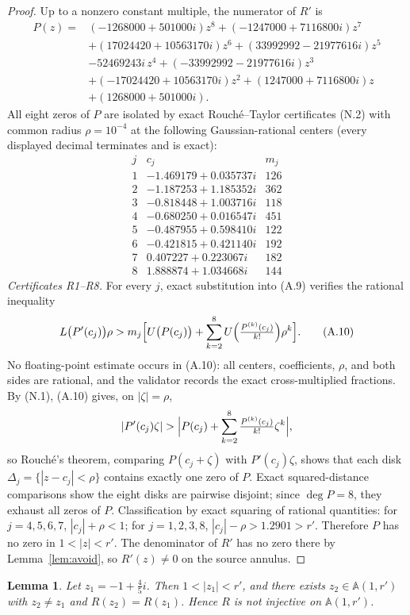 \documentclass[11pt,reqno]{amsart}
\newtheorem{lemma}[theorem]{Lemma}
\theoremstyle{definition}
\theoremstyle{remark}
\begin{document}
\begin{proof}
Up to a nonzero constant multiple, the numerator of \(R'\) is
\[\begin{aligned} P(z)={}&(-1268000+501000i)z^{8}+(-1247000+7116800i)z^{7}\\ &+(17024420+10563170i)z^{6}+(33992992-21977616i)z^{5}\\ &-52469243i\,z^{4}+(-33992992-21977616i)z^{3}\\ &+(-17024420+10563170i)z^{2}+(1247000+7116800i)z\\ &+(1268000+501000i). \end{aligned}\tag{A.9}\]
All eight zeros of \(P\) are isolated by exact Rouch\'e--Taylor certificates (N.2) with common radius \(\rho=10^{-4}\) at the following Gaussian-rational centers (every displayed decimal terminates and is exact):
\[\begin{array}{r|l|r}
j & c_j & m_j\\\hline
1 & -1.469179+0.035737i & 126\\
2 & -1.187253+1.185352i & 362\\
3 & -0.818448+1.003716i & 118\\
4 & -0.680250+0.016547i & 451\\
5 & -0.487955+0.598410i & 122\\
6 & -0.421815+0.421140i & 192\\
7 & 0.407227+0.223067i & 182\\
8 & 1.888874+1.034668i & 144
\end{array}\]
\emph{Certificates R1--R8.} For every \(j\), exact substitution into (A.9) verifies the rational inequality
\[ L\bigl(P'(c_j)\bigr)\rho>m_j\Bigl[U\bigl(P(c_j)\bigr)+\sum_{k=2}^{8}U\Bigl(\tfrac{P^{(k)}(c_j)}{k!}\Bigr)\rho^{k}\Bigr]. \tag{A.10} \]
No floating-point estimate occurs in (A.10): all centers, coefficients, \(\rho\), and both sides are rational, and the validator records the exact cross-multiplied fractions. By (N.1), (A.10) gives, on \(|\zeta|=\rho\),
\[ |P'(c_j)\zeta|>\Bigl|P(c_j)+\sum_{k=2}^{8}\tfrac{P^{(k)}(c_j)}{k!}\zeta^{k}\Bigr|, \]
so Rouch\'e's theorem, comparing \(P(c_j+\zeta)\) with \(P'(c_j)\zeta\), shows that each disk \(\Delta_j=\{|z-c_j|<\rho\}\) contains exactly one zero of \(P\). Exact squared-distance comparisons show the eight disks are pairwise disjoint; since \(\deg P=8\), they exhaust all zeros of \(P\).
Classification by exact squaring of rational quantities: for \(j=4,5,6,7\), \(|c_j|+\rho<1\); for \(j=1,2,3,8\), \(|c_j|-\rho>1.2901>r'\). Therefore \(P\) has no zero in \(1<|z|<r'\). The denominator of \(R'\) has no zero there by Lemma~\ref{lem:avoid}, so \(R'(z)\ne0\) on the source annulus.
\end{proof}
\begin{lemma}\label{lem:collision}
Let \(z_1=-1+\tfrac45 i\). Then \(1<|z_1|<r'\), and there exists \(z_2\in\mathbb A(1,r')\) with \(z_2\ne z_1\) and \(R(z_2)=R(z_1)\). Hence \(R\) is not injective on \(\mathbb A(1,r')\).
\end{lemma}
\end{document}
